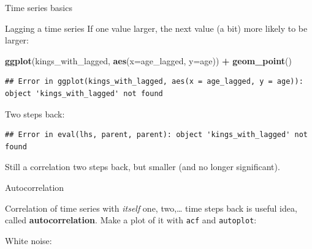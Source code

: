 \documentclass[ignorenonframetext,]{beamer}
\newenvironment{Shaded}{\begin{snugshade}}{\end{snugshade}}
\newcommand{\DataTypeTok}[1]{\textcolor[rgb]{0.13,0.29,0.53}{#1}}
\newcommand{\DecValTok}[1]{\textcolor[rgb]{0.00,0.00,0.81}{#1}}
\newcommand{\KeywordTok}[1]{\textcolor[rgb]{0.13,0.29,0.53}{\textbf{#1}}}
\newcommand{\NormalTok}[1]{#1}
\newcommand{\OperatorTok}[1]{\textcolor[rgb]{0.81,0.36,0.00}{\textbf{#1}}}
\newcommand{\StringTok}[1]{\textcolor[rgb]{0.31,0.60,0.02}{#1}}
\begin{document}
\begin{frame}[fragile]{Time series basics}
\begin{block}{Lagging a time series}
If one value larger, the next value (a bit) more likely to be larger:

\begin{Shaded}
\begin{Highlighting}[]
\KeywordTok{ggplot}\NormalTok{(kings_with_lagged, }\KeywordTok{aes}\NormalTok{(}\DataTypeTok{x=}\NormalTok{age_lagged, }\DataTypeTok{y=}\NormalTok{age)) }\OperatorTok{+}\StringTok{ }\KeywordTok{geom_point}\NormalTok{()}
\end{Highlighting}
\end{Shaded}

\begin{verbatim}
## Error in ggplot(kings_with_lagged, aes(x = age_lagged, y = age)): object 'kings_with_lagged' not found
\end{verbatim}

Two steps back:

\begin{Shaded}
\end{Shaded}

\begin{verbatim}
## Error in eval(lhs, parent, parent): object 'kings_with_lagged' not found
\end{verbatim}

Still a correlation two steps back, but smaller (and no longer
significant).

\end{block}

\begin{block}{Autocorrelation}

Correlation of time series with \emph{itself} one, two,\ldots{} time
steps back is useful idea, called \textbf{autocorrelation}. Make a plot
of it with \texttt{acf} and \texttt{autoplot}:

White noise:

\begin{Shaded}
\end{Shaded}


\end{block}
\end{frame}
\end{document}
